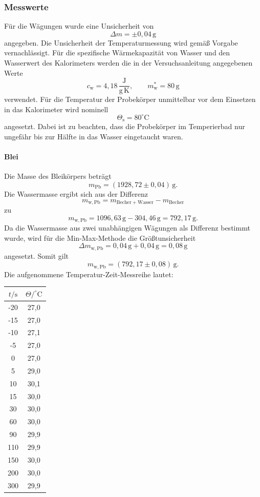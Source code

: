 \documentclass{report}
\begin{document}
\subsubsection{Messwerte}
\noindent
Für die Wägungen wurde eine Unsicherheit von
\[
\Delta m = \pm 0{,}04\,\mathrm{g}
\]
\noindent
angegeben. Die Unsicherheit der Temperaturmessung wird gemäß Vorgabe
vernachlässigt.
\noindent
Für die spezifische Wärmekapazität von Wasser und den Wasserwert des
Kalorimeters werden die in der Versuchsanleitung angegebenen Werte
\[
c_\mathrm{w} = 4{,}18\,\frac{\mathrm{J}}{\mathrm{g\,K}},
\qquad
m_\mathrm{w}^{*} = 80\,\mathrm{g}
\]
verwendet.
\noindent
Für die Temperatur der Probekörper unmittelbar vor dem Einsetzen in das
Kalorimeter wird nominell
\[
\Theta_\mathrm{s} = 80^\circ\mathrm{C}
\]
\noindent
angesetzt. Dabei ist zu beachten, dass die Probekörper im Temperierbad nur
ungefähr bis zur Hälfte in das Wasser eingetaucht waren.

\paragraph{Blei}
\noindent
Die Masse des Bleikörpers beträgt
\[
m_\mathrm{Pb} = (1928{,}72 \pm 0{,}04)\,\mathrm{g}.
\]
\noindent
Die Wassermasse ergibt sich aus der Differenz
\[
m_{\mathrm{w,Pb}}
=
m_{\mathrm{Becher+Wasser}}-m_{\mathrm{Becher}}
\]
zu
\[
m_{\mathrm{w,Pb}}
=
1096{,}63\,\mathrm{g}-304{,}46\,\mathrm{g}
=
792{,}17\,\mathrm{g}.
\]
\noindent
Da die Wassermasse aus zwei unabhängigen Wägungen als Differenz bestimmt
wurde, wird für die Min-Max-Methode die Größtunsicherheit
\[
\Delta m_{\mathrm{w,Pb}}
=
0{,}04\,\mathrm{g}+0{,}04\,\mathrm{g}
=
0{,}08\,\mathrm{g}
\]
\noindent
angesetzt. Somit gilt
\[
m_{\mathrm{w,Pb}}=(792{,}17\pm0{,}08)\,\mathrm{g}.
\]
\noindent
Die aufgenommene Temperatur-Zeit-Messreihe lautet:

\begin{center}
\begin{tabular}{c|c}
$t/\mathrm{s}$ & $\Theta/^\circ\mathrm{C}$\\
\hline
-20 & 27,0\\
-15 & 27,0\\
-10 & 27,1\\
-5  & 27,0\\
0   & 27,0\\
5   & 29,0\\
10  & 30,1\\
15  & 30,0\\
30  & 30,0\\
60  & 30,0\\
90  & 29,9\\
110 & 29,9\\
150 & 30,0\\
200 & 30,0\\
300 & 29,9
\end{tabular}
\end{center}
\end{document}
